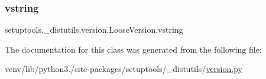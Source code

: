 \mbox{\label{classsetuptools_1_1__distutils_1_1version_1_1LooseVersion_a601a1a7e7a2829b4e9973dab0c29d231}} 
\subsubsection{\texorpdfstring{vstring}{vstring}}
{\footnotesize\ttfamily setuptools.\+\_\+distutils.\+version.\+Loose\+Version.\+vstring}



The documentation for this class was generated from the following file\+:\begin{DoxyCompactItemize}
\item 
venv/lib/python3./site-\/packages/setuptools/\+\_\+distutils/\hyperlink{setuptools_2__distutils_2version_8py}{version.\+py}\end{DoxyCompactItemize}
